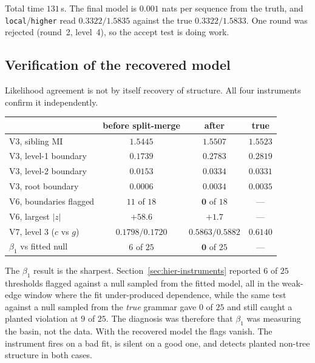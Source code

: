 \documentclass[11pt,a4paper]{article}
\theoremstyle{plain}
\theoremstyle{definition}
\begin{document}
\noindent
Total time $131$\,s. The final model is $0.001$ nats per sequence from the
truth, and \texttt{local}/\texttt{higher} read $0.3322/1.5835$ against the true
$0.3322/1.5833$. One round was rejected (round~2, level~4), so the accept test
is doing work.

\subsection{Verification of the recovered model}

Likelihood agreement is not by itself recovery of structure. All four
instruments confirm it independently.

\begin{center}
\begin{tabular}{lccc}
\toprule
 & before split-merge & after & true \\
\midrule
V3, sibling MI               & $1.5445$ & $1.5507$ & $1.5523$ \\
V3, level-1 boundary         & $0.1739$ & $0.2783$ & $0.2819$ \\
V3, level-2 boundary         & $0.0153$ & $0.0334$ & $0.0331$ \\
V3, root boundary            & $0.0006$ & $0.0034$ & $0.0035$ \\
V6, boundaries flagged       & $11$ of $18$ & $\mathbf{0}$ of $18$ & --- \\
V6, largest $|z|$            & $+58.6$ & $+1.7$ & --- \\
V7, level 3 ($c$ vs $g$)     & $0.1798/0.1720$ & $0.5863/0.5882$ & $0.6140$ \\
$\beta_1$ vs fitted null     & $6$ of $25$ & $\mathbf{0}$ of $25$ & --- \\
\bottomrule
\end{tabular}
\end{center}

\noindent
The $\beta_1$ result is the sharpest. Section~\ref{sec:hier-instruments}
reported $6$ of $25$ thresholds flagged against a null sampled from the fitted
model, all in the weak-edge window where the fit under-produced dependence,
while the same test against a null sampled from the \emph{true} grammar gave
$0$ of $25$ and still caught a planted violation at $9$ of $25$. The diagnosis
was therefore that $\beta_1$ was measuring the basin, not the data. With the
recovered model the flags vanish. The instrument fires on a bad fit, is silent
on a good one, and detects planted non-tree structure in both cases.
\end{document}
